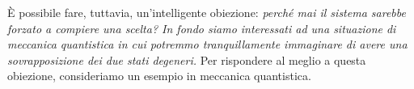 \documentclass[../main.tex]{subfiles}
\begin{document}
È possibile fare, tuttavia, un'intelligente obiezione: \textit{perché mai il sistema sarebbe forzato a compiere una scelta? In fondo siamo interessati ad una situazione di meccanica quantistica in cui potremmo tranquillamente immaginare di avere una sovrapposizione dei due stati degeneri.} Per rispondere al meglio a questa obiezione, consideriamo un esempio in meccanica quantistica.
\end{document}
